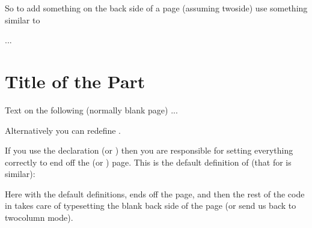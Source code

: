 So to add something on the back side of a \cmd{\part} page (assuming
twoside) use something similar to
\begin{lcode}
...
\nopartblankpage
\part{Title of the Part}
\thispagestyle{simple}
Text on the following (normally blank page)
\clearpage
...
\end{lcode}
    Alternatively you can redefine \cmd{\partpageend}.
 
   If you use the declaration \cmd{\nopartblankpage} (or \cmd{\nobookblankpage})
then you are responsible for setting everything correctly to end off the
\cmd{\part} (or \cmd{\book}) page. This is the default definition of 
\cmd{\partpageend} (that for \cmd{\bookpageend} is similar):
\begin{lcode}
\newcommand{\partpageend}{%
  \afterpartskip
  \ifm@mnopartnewpage%
  \else%
    \if@twoside
      \if@openright%
        \null
        \thispagestyle{afterpart}%
        \newpage
      \fi
    \fi
  \fi
  \if@tempswa%
    \twocolumn
  \fi}
\end{lcode}
Here with the default definitions, \cmd{\afterpartskip} ends off the
\cmd{\part} page, and then the rest of the code in \cmd{\partpageend}
takes care of typesetting the blank back side of the \cmd{\part} page
(or send us back to twocolumn mode).

